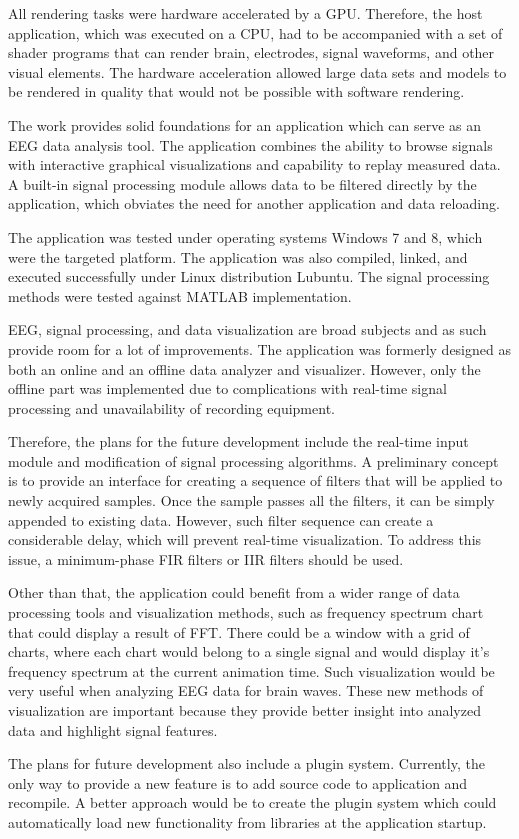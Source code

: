 All rendering tasks were hardware accelerated by a GPU. Therefore, the host application, which was executed on a CPU, had to be accompanied with a set of shader programs that can render brain, electrodes, signal waveforms, and other visual elements. The hardware acceleration allowed large data sets and models to be rendered in quality that would not be possible with software rendering.

The work provides solid foundations for an application which can serve as an EEG data analysis tool. The application combines the ability to browse signals with interactive graphical visualizations and capability to replay measured data. A built-in signal processing module allows data to be filtered directly by the application, which obviates the need for another application and data reloading.

The application was tested under operating systems Windows 7 and 8, which were the targeted platform. The application was also compiled, linked, and executed successfully under Linux distribution Lubuntu. The signal processing methods were tested against MATLAB implementation. 

EEG, signal processing, and data visualization are broad subjects and as such provide room for a lot of improvements. The application was formerly designed as both an online and an offline data analyzer and visualizer. However, only the offline part was implemented due to complications with real-time signal processing and unavailability of recording equipment.

Therefore, the plans for the future development include the real-time input module and modification of signal processing algorithms. A preliminary concept is to provide an interface for creating a sequence of filters that will be applied to newly acquired samples. Once the sample passes all the filters, it can be simply appended to existing data. However, such filter sequence can create a considerable delay, which will prevent real-time visualization. To address this issue, a minimum-phase FIR filters or IIR filters should be used.

Other than that, the application could benefit from a wider range of data processing tools and visualization methods, such as frequency spectrum chart that could display a result of FFT. There could be a window with a grid of charts, where each chart would belong to a single signal and would display it's frequency spectrum at the current animation time. Such visualization would be very useful when analyzing EEG data for brain waves. These new methods of visualization are important because they provide better insight into analyzed data and highlight signal features. 

The plans for future development also include a plugin system. Currently, the only way to provide a new feature is to add source code to application and recompile. A better approach would be to create the plugin system which could automatically load new functionality from libraries at the application startup. 

